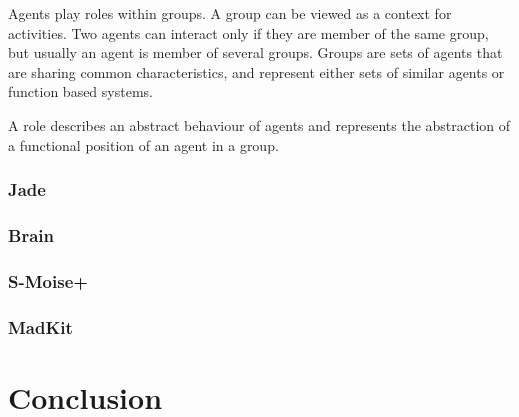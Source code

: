 \documentclass{article}
\begin{document}
Agents play roles within groups. A group can be viewed as a context
for activities. Two agents can interact only if they are member of
the same group, but usually an agent is member of several groups.
Groups are sets of agents that are sharing common characteristics, and
represent either sets of similar agents or function based systems.

A role describes an abstract behaviour of agents and represents the
abstraction of a functional position of an agent in a group.


\subsubsection{Jade} 
\subsubsection{Brain} 
\subsubsection{S-Moise+}
\subsubsection{MadKit}

\section{Conclusion}



\end{document}
